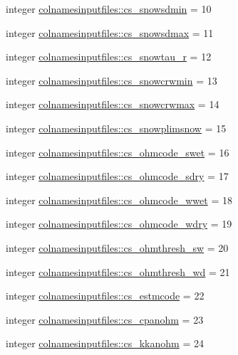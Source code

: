 \begin{DoxyCompactItemize}
\item 
integer \hyperlink{namespacecolnamesinputfiles_a527f1adfa8ec04c88f77c6331a0fa3e3}{colnamesinputfiles\+::cs\+\_\+snowsdmin} = 10
\item 
integer \hyperlink{namespacecolnamesinputfiles_a0d7e04ea2aa9c4c1942bec1b07aa8c2b}{colnamesinputfiles\+::cs\+\_\+snowsdmax} = 11
\item 
integer \hyperlink{namespacecolnamesinputfiles_a499961ef44ea0d56e53b8b62d78b4c54}{colnamesinputfiles\+::cs\+\_\+snowtau\+\_\+r} = 12
\item 
integer \hyperlink{namespacecolnamesinputfiles_a4ed5aa735a6c288a3fee77c1acdac986}{colnamesinputfiles\+::cs\+\_\+snowcrwmin} = 13
\item 
integer \hyperlink{namespacecolnamesinputfiles_ad582e1a28ee160f5284d28f4e812b789}{colnamesinputfiles\+::cs\+\_\+snowcrwmax} = 14
\item 
integer \hyperlink{namespacecolnamesinputfiles_a43f09364a800feba853b60bf242eb294}{colnamesinputfiles\+::cs\+\_\+snowplimsnow} = 15
\item 
integer \hyperlink{namespacecolnamesinputfiles_af52bb9fada406f3a3df73885970550a3}{colnamesinputfiles\+::cs\+\_\+ohmcode\+\_\+swet} = 16
\item 
integer \hyperlink{namespacecolnamesinputfiles_aac0a74a601839badabaea7de54b70a14}{colnamesinputfiles\+::cs\+\_\+ohmcode\+\_\+sdry} = 17
\item 
integer \hyperlink{namespacecolnamesinputfiles_adc4f1ba02ae2dca54b27ca13a5b3f09c}{colnamesinputfiles\+::cs\+\_\+ohmcode\+\_\+wwet} = 18
\item 
integer \hyperlink{namespacecolnamesinputfiles_ac9094a91e567542360bcf0cc0c082a7e}{colnamesinputfiles\+::cs\+\_\+ohmcode\+\_\+wdry} = 19
\item 
integer \hyperlink{namespacecolnamesinputfiles_a3ab24828e348ec0efcec26ea92db540f}{colnamesinputfiles\+::cs\+\_\+ohmthresh\+\_\+sw} = 20
\item 
integer \hyperlink{namespacecolnamesinputfiles_a1ade5e515336fe9240bf46c18760cc8b}{colnamesinputfiles\+::cs\+\_\+ohmthresh\+\_\+wd} = 21
\item 
integer \hyperlink{namespacecolnamesinputfiles_a9ec8d7169edb6eb99d629d83b0fd180f}{colnamesinputfiles\+::cs\+\_\+estmcode} = 22
\item 
integer \hyperlink{namespacecolnamesinputfiles_a703943b50c9fca1069fb4bf8dc1a1938}{colnamesinputfiles\+::cs\+\_\+cpanohm} = 23
\item 
integer \hyperlink{namespacecolnamesinputfiles_a03022e15ff7b5ee61681506cf7c51a2d}{colnamesinputfiles\+::cs\+\_\+kkanohm} = 24

\end{DoxyCompactItemize}
